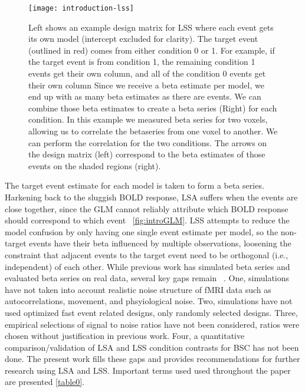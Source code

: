 \documentclass[10pt,letterpaper]{article}
\begin{document}
\begin{figure}[H]
  \centering
  \texttt{[image: introduction-lss]}
  \caption{
    Left shows an example design matrix for LSS where each event gets its own model
    (intercept excluded for clarity).
    The target event (outlined in red) comes from either condition 0 or 1.
    For example, if the target event is from condition 1, the remaining condition 1 events
    get their own column, and all of the condition 0 events get their own column
    Since we receive a beta estimate per model, we end up with as many beta estimates as there
    are events.
    We can combine those beta estimates to create a beta series (Right) for each condition.
    In this example we measured beta series for two voxels, allowing us to
    correlate the betaseries from one voxel to another.
    We can perform the correlation for the two conditions.
    The arrows on the design matrix (left) correspond to the beta estimates of those events
    on the shaded regions (right).
  }
  \label{fig:introlss}
\end{figure}

The target event estimate for each model is taken to form a beta series.
Harkening back to the sluggish BOLD response, LSA suffers when the events are close together,
since the GLM cannot reliably attribute which BOLD response should correspond to which event ~\ref{fig:introGLM}.
LSS attempts to reduce the model confusion by only having one single event estimate per model,
so the non-target events have their beta influenced by multiple observations, loosening the
constraint that adjacent events to the target event need to be orthogonal (i.e., independent) of each other.
While previous work has simulated beta series and evaluated beta series on real data,
several key gaps remain ~\cite{Mumford2014a,Mumford2012,Turner2012a,Abdulrahman2016,Cisler2012,Arco2018}.
One, simulations have not taken into account realistic noise structure of fMRI data such as autocorrelations, movement, and phsyiological noise.
Two, simulations have not used optimized fast event related designs, only randomly selected designs. 
Three, empirical selections of signal to noise ratios have not been considered,
ratios were chosen without justification in previous work.
Four, a quantitative comparison/validation of LSA and LSS condition contrasts for BSC has not been done.
The present work fills these gaps and provides recommendations for further research
using LSA and LSS.
Important terms used used throughout the paper are presented \ref{table0}.
\end{document}
